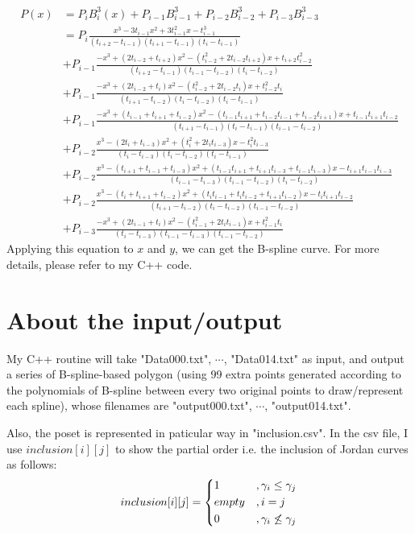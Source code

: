\documentclass[]{article}
\begin{document}
\begin{align*}
	P(x) &= P_iB_i^3(x) + P_{i-1}B_{i-1}^3 + P_{i-2}B_{i-2}^3 + P_{i-3}B_{i-3}^3 \\
	&= P_i\frac{x^3 - 3t_{i-1}x^2 + 3t_{i-1}^2x - t_{i-1}^3}  {(t_{i+2} - t_{i-1})(t_{i+1} - t_{i-1})(t_i - t_{i-1})} \\
	&+ P_{i-1}\frac{-x^3 + (2t_{i-2}+t_{i+2})x^2 - (t_{i-2}^2+2t_{i-2}t_{i+2})x + t_{i+2}t_{i-2}^2}  {(t_{i+2} - t_{i-1})(t_{i-1} - t_{i-2})(t_i - t_{i-2})} \\
	&+ P_{i-1}\frac{-x^3 + (2t_{i-2}+t_i)x^2 - (t_{i-2}^2+2t_{i-2}t_i)x + t_{i-2}^2t_i}  {(t_{i+1} - t_{i-2})(t_i - t_{i-2})(t_i-t_{i-1})} \\
	&+ P_{i-1}\frac{-x^3 + (t_{i-1}+t_{i+1}+t_{i-2})x^2 - (t_{i-1}t_{i+1}+t_{i-2}t_{i-1}+t_{i-2}t_{i+1})x+t_{i-1}t_{i+1}t_{i-2}}  {(t_{i+1}-t_{i-1})(t_i-t_{i-1})(t_{i-1}-t_{i-2})} \\
	&+ P_{i-2}\frac{x^3 - (2t_i+t_{i-3})x^2 + (t_i^2+2t_it_{i-3})x - t_i^2t_{i-3}}  {(t_i-t_{i-3})(t_i-t_{i-2})(t_i-t_{i-1})} \\
	&+ P_{i-2}\frac{x^3 - (t_{i+1}+t_{i-1}+t_{i-3})x^2 + (t_{i-1}t_{i+1}+t_{i+1}t_{i-3}+t_{i-1}t_{i-3})x - t_{i+1}t_{i-1}t_{i-3}}  {(t_{i-1}-t_{i-3})(t_{i-1}-t_{i-2})(t_i-t_{i-2})} \\
	&+ P_{i-2}\frac{x^3 - (t_i+t_{i+1}+t_{i-2})x^2 + (t_it_{i-1}+t_it_{i-2}+t_{i+1}t_{i-2})x - t_it_{i+1}t_{i-2}}  {(t_{i+1}-t_{i-2})(t_i-t_{i-2})(t_{i-1}-t_{i-2})} \\
	&+ P_{i-3}\frac{-x^3 + (2t_{i-1}+t_i)x^2 - (t_{i-1}^2+2t_it_{i-1})x + t_{i-1}^2t_i}  {(t_i-t_{i-3})(t_{i-1}-t_{i-3})(t_{i-1}-t_{i-2})}
\end{align*}
Applying this equation to $x$ and $y$, we can get the B-spline curve. For more details, please refer to my C++ code.



\section{About the input/output}
\par
My C++ routine will take "Data000.txt", $\cdots$, "Data014.txt" as input, and output a series of B-spline-based polygon
(using 99 extra points generated according to the polynomials of B-spline between every two original points to draw/represent each spline), 
whose filenames are "output000.txt", $\cdots$, "output014.txt".\par
Also, the poset is represented in paticular way in "inclusion.csv". 
In the csv file, I use $inclusion[i][j]$ to show the partial order i.e. the inclusion of Jordan curves as follows:
$$inclusion[i][j] = \begin{dcases}
	1 &, \gamma_i \leq \gamma_j \\
	empty &, i = j \\
	0 &, \gamma_i \not\leq \gamma_j
\end{dcases}$$
\end{document}
